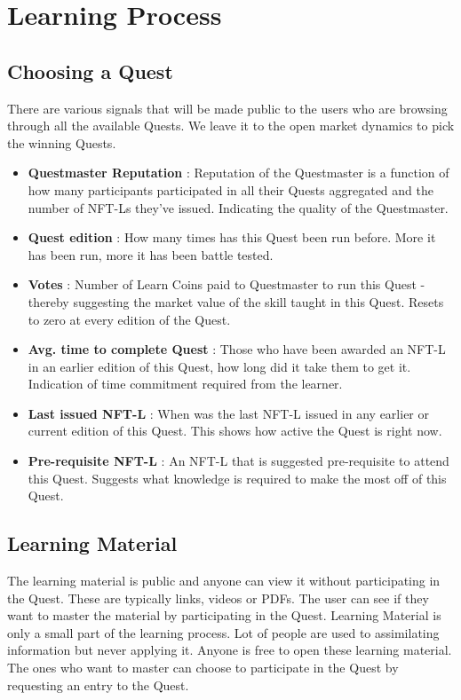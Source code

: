 \documentclass{article}
\begin{document}
  \section{Learning Process}
    \subsection{Choosing a Quest}
        There are various signals that will be made public to the users who are browsing through all the available Quests. We leave it to the open market dynamics to pick the winning Quests.
        \begin{itemize}
          \item \textbf{Questmaster Reputation }: Reputation of the Questmaster is a function of how many participants participated in all their Quests aggregated and the number of NFT-Ls they've issued. Indicating the quality of the Questmaster.
          \item \textbf{Quest edition }: How many times has this Quest been run before. More it has been run, more it has been battle tested.
          \item \textbf{Votes }: Number of Learn Coins paid to Questmaster to run this Quest - thereby suggesting the market value of the skill taught in this Quest. Resets to zero at every edition of the Quest.
          \item \textbf{Avg. time to complete Quest }: Those who have been awarded an NFT-L in an earlier edition of this Quest, how long did it take them to get it. Indication of time commitment required from the learner. 
          \item \textbf{Last issued NFT-L }:  When was the last NFT-L issued in any earlier or current edition of this Quest. This shows how active the Quest is right now. 
          \item \textbf{Pre-requisite NFT-L }: An NFT-L that is suggested pre-requisite to attend this Quest. Suggests what knowledge is required to make the most off of this Quest.
        \end{itemize}
    \subsection{Learning Material}
        The learning material is public and anyone can view it without participating in the Quest. 
        These are typically links, videos or PDFs. The user can see if they want to master the material by participating in the Quest. 
        Learning Material is only a small part of the learning process. Lot of people are used to assimilating information but never applying it. 
        Anyone is free to open these learning material. The ones who want to master can choose to participate in the Quest by requesting an entry to the Quest.
\end{document}
